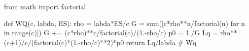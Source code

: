 
from math import factorial

def WQ(c, labda, ES):
    rho = labda*ES/c
    G = sum([c*rho**n/factorial(n) for n in range(c)])
    G += (c*rho)**c/factorial(c)/(1.-rho/c)
    p0 = 1./G
    Lq = rho**(c+1)/c/(factorial(c)*(1.-rho/c)**2)*p0
    return Lq/labda # Wq


